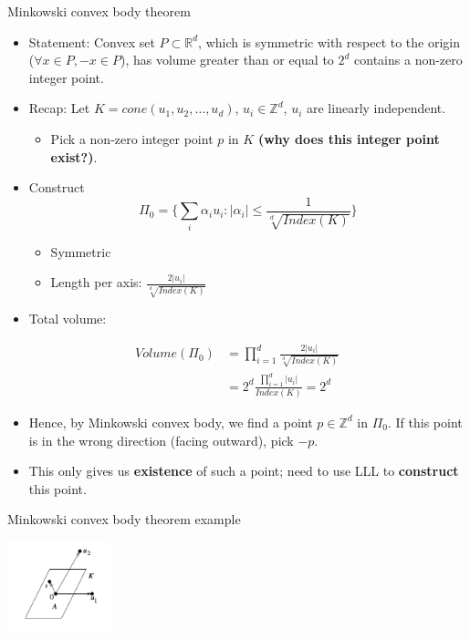 \documentclass[8pt]{beamer}
\begin{document}
\begin{frame}[label=sec-19]{Minkowski convex body theorem}
\begin{itemize}
\item Statement: Convex set $P \subset \mathbb{R}^d$, which is symmetric with respect to the origin ($\forall x \in P, -x \in P$), has volume greater than or
equal to $2^d$ contains a non-zero integer point.

\item Recap: Let $K = cone(u_1, u_2, \ldots, u_d)$, $u_i \in \mathbb{Z}^d$, $u_i$ are linearly independent.
\begin{itemize}
\item Pick a non-zero integer point $p$ in $K$ \textbf{(why does this integer point exist?)}.
\end{itemize}

\item Construct $$\Pi_0 = \Bigg\{ \sum_i \alpha_i u_i :  |\alpha_i| \leq \frac{1}{\sqrt[d]{Index(K)}}  \Bigg\}$$
\begin{itemize}
\item Symmetric
\item Length per axis: $\frac{2 |u_i|}{\sqrt[d]{Index(K)}}$
\end{itemize}

\item Total volume:
\end{itemize}
\begin{align*}
Volume(\Pi_0) &= \prod_{i=1}^d \frac{2 |u_i|}{\sqrt[d]{Index(K)}}\\
 &= 2^d \frac{ \prod_{i=1}^d |u_i| }{Index(K)} = 2^d
\end{align*}

\begin{itemize}
\item Hence, by Minkowski convex body, we find a point $p \in \mathbb{Z}^d$ in $\Pi_0$. If this point is in the wrong direction (facing outward), pick $-p$.

\item This only gives us \textbf{existence} of such a point; need to use LLL to \textbf{construct} this point.
\end{itemize}
\end{frame}

\begin{frame}[label=sec-20]{Minkowski convex body theorem example}
\begin{center}
\includegraphics[width=3cm, keepaspectratio]{res/minkowski-convex-body}
\end{center}
\end{frame}
\end{document}
